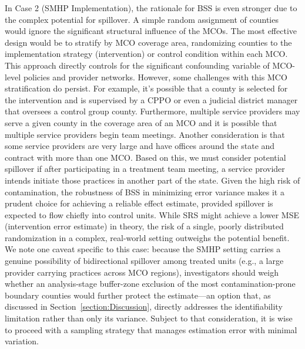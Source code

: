\documentclass{article}[11pt]
\begin{document}
In Case 2 (SMHP Implementation), the rationale for BSS is even stronger due to the complex potential for spillover. A simple random assignment of counties would ignore the significant structural influence of the MCOs. The most effective design would be to stratify by MCO coverage area, randomizing counties to the implementation strategy (intervention) or control condition within each MCO. This approach directly controls for the significant confounding variable of MCO-level policies and provider networks. However, some challenges with this MCO stratification do persist. For example, it's possible that a county is selected for the intervention and is supervised by a CPPO or even a judicial district manager that oversees a control group county. Furthermore, multiple service providers may serve a given county in the coverage area of an MCO and it is possible that multiple service providers begin team meetings. Another consideration is that some service providers are very large and have offices around the state and contract with more than one MCO. Based on this, we must consider potential spillover if after participating in a treatment team meeting, a service provider intends initiate those practices in another part of the state. Given the high risk of contamination, the robustness of BSS in minimizing error variance makes it a prudent choice for achieving a reliable effect estimate, provided spillover is expected to flow chiefly into control units. While SRS might achieve a lower MSE (intervention error estimate) in theory, the risk of a single, poorly distributed randomization in a complex, real-world setting outweighs the potential benefit. We note one caveat specific to this case: because the SMHP setting carries a genuine possibility of bidirectional spillover among treated units (e.g., a large provider carrying practices across MCO regions), investigators should weigh whether an analysis-stage buffer-zone exclusion of the most contamination-prone boundary counties would further protect the estimate---an option that, as discussed in Section~\ref{section:Discussion}, directly addresses the identifiability limitation rather than only its variance. Subject to that consideration, it is wise to proceed with a sampling strategy that manages estimation error with minimal variation.
\end{document}
